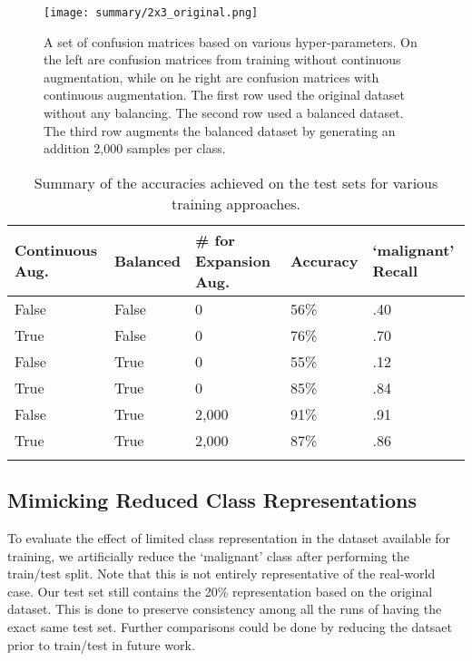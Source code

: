 \documentclass[sn-mathphys,Numbered]{sn-jnl}%
\theoremstyle{thmstyleone}%
\theoremstyle{thmstyletwo}%
\theoremstyle{thmstylethree}%
\begin{document}
\begin{figure}[!htbp]
    \centering

    \texttt{[image: summary/2x3\_original.png]}

    \caption{A set of confusion matrices based on various hyper-parameters.  On the left are confusion matrices from training without continuous augmentation, while on he right are confusion matrices with continuous augmentation.  The first row used the original dataset without any balancing.  The second row used a balanced dataset.  The third row augments the balanced dataset by generating an addition 2,000 samples per class.}
    \label{fig:2x3_original}
\end{figure}



\begin{table}[h]
\caption{Summary of the accuracies achieved on the test sets for various training approaches.}\label{dataaccuracies}
\begin{tabular}{@{}lllll@{}}%
\toprule
Continuous Aug. & Balanced & \# for Expansion Aug.  & Accuracy & `malignant' Recall\\
\midrule
False & False & 0 & 56\% & .40 \\
True & False & 0 & 76\% & .70 \\
False & True & 0 & 55\% & .12 \\
True & True & 0 & 85\% & .84 \\
False & True & 2,000 & 91\% & .91 \\
True & True & 2,000 & 87\% & .86 \\
\botrule
\end{tabular}
\end{table}



\subsection{Mimicking Reduced Class Representations}\label{sectraining_reductions}
To evaluate the effect of limited class representation in the dataset available for training, we artificially reduce the `malignant' class after performing the train/test split.  Note that this is not entirely representative of the real-world case.  Our test set still contains the 20\% representation based on the original dataset.  This is done to preserve consistency among all the runs of having the exact same test set.  Further comparisons could be done by reducing the datsaet prior to train/test in future work.
\end{document}
